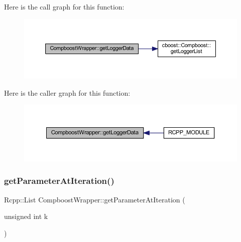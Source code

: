 Here is the call graph for this function\+:\nopagebreak
\begin{figure}[H]
\begin{center}
\leavevmode
\includegraphics[width=350pt]{class_compboost_wrapper_a3175f9dd0d66d042eb5bb9cab859e086_cgraph}
\end{center}
\end{figure}
Here is the caller graph for this function\+:\nopagebreak
\begin{figure}[H]
\begin{center}
\leavevmode
\includegraphics[width=350pt]{class_compboost_wrapper_a3175f9dd0d66d042eb5bb9cab859e086_icgraph}
\end{center}
\end{figure}
\mbox{\label{class_compboost_wrapper_ac5d5d21932a27b470abbfb0fd55a75ec}} 
\subsubsection{\texorpdfstring{get\+Parameter\+At\+Iteration()}{getParameterAtIteration()}}
{\footnotesize\ttfamily Rcpp\+::\+List Compboost\+Wrapper\+::get\+Parameter\+At\+Iteration (\begin{DoxyParamCaption}\item[{unsigned int}]{k }\end{DoxyParamCaption})\hspace{0.3cm}{\ttfamily [inline]}}

